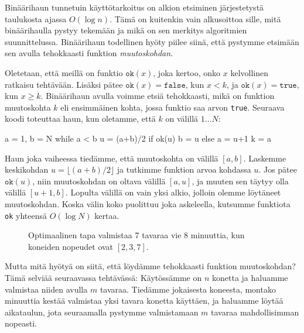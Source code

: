 
Binäärihaun tunnetuin käyttötarkoitus on alkion etsiminen
järjestetystä taulukosta ajassa $O(\log n)$.
Tämä on kuitenkin vain alkusoittoa sille,
mitä binää\-rihaulla pystyy tekemään ja mikä on sen
merkitys algoritmien suunnittelussa.
Binääri\-haun todellinen hyöty piilee siinä,
että pystymme etsimään sen avulla tehokkaasti funktion \emph{muutoskohdan}.

Oletetaan, että meillä on funktio $\texttt{ok}(x)$,
joka kertoo, onko $x$ kelvollinen ratkaisu tehtävään.
Lisäksi pätee $\texttt{ok}(x)=\texttt{false}$, kun $x<k$,
ja $\texttt{ok}(x)=\texttt{true}$, kun $x \ge k$.
Binäärihaun avulla voimme etsiä tehokkaasti,
mikä on funktion muutoskohta $k$
eli ensimmäinen kohta, jossa funktio saa arvon \texttt{true}.
Seuraava koodi toteuttaa haun, kun oletamme, että $k$ on välillä $1 \dots N$:

\begin{code}
a = 1, b = N
while a < b
    u = (a+b)/2
    if ok(u)
        b = u
    else
        a = u+1
k = a
\end{code}

Haun joka vaiheessa tiedämme, että muutoskohta on välillä $[a,b]$.
Laskemme keskikohdan $u=\lfloor (a+b)/2 \rfloor$ ja tutkimme funktion arvoa kohdassa $u$.
Jos pätee $\texttt{ok}(u)$, niin muutoskohdan on oltava välillä $[a,u]$,
ja muuten sen täytyy olla välillä $[u+1,b]$.
Lopulta välillä on vain yksi alkio, jolloin olemme löytäneet muutoskohdan.
Koska välin koko puolittuu joka askeleella,
kutsumme funktiota \texttt{ok} yhteensä $O(\log N)$ kertaa.

\begin{figure}
\center
{}
\caption{Optimaalinen tapa valmistaa 7 tavaraa vie 8 minuuttia,
kun koneiden nopeudet ovat $[2,3,7]$.}
\label{fig:optkon}
\end{figure}

Mutta mitä hyötyä on siitä, että löydämme tehokkaasti funktion muutoskohdan?
Tämä selviää seuraavassa tehtävässä:
Käytössämme on $n$ konetta
ja haluamme valmistaa niiden avulla $m$ tavaraa.
Tiedämme jokaisesta koneesta,
montako minuuttia kestää valmistaa yksi tavara konetta käyttäen,
ja haluamme löytää aikataulun, jota seuraamalla pystymme valmistamaan
$m$ tavaraa mahdollisimman nopeasti.

